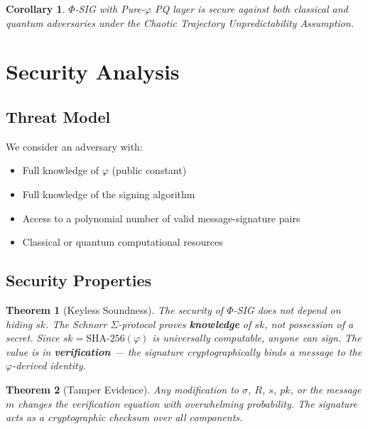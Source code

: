 \documentclass{article}
\newtheorem{theorem}{Theorem}[section]
\newtheorem{corollary}{Corollary}[theorem]
\begin{document}
\begin{corollary}
$\Phi$-SIG with Pure-$\varphi$ PQ layer is secure against both classical and quantum adversaries under the Chaotic Trajectory Unpredictability Assumption.
\end{corollary}

\section{Security Analysis}

\subsection{Threat Model}

We consider an adversary with:
\begin{itemize}
    \item Full knowledge of $\varphi$ (public constant)
    \item Full knowledge of the signing algorithm
    \item Access to a polynomial number of valid message-signature pairs
    \item Classical or quantum computational resources
\end{itemize}

\subsection{Security Properties}

\begin{theorem}[Keyless Soundness]
The security of $\Phi$-SIG does not depend on hiding $sk$. The Schnorr $\Sigma$-protocol proves \textbf{knowledge} of $sk$, not possession of a secret. Since $sk = \text{SHA-256}(\varphi)$ is universally computable, anyone \textit{can} sign. The value is in \textbf{verification} — the signature cryptographically binds a message to the $\varphi$-derived identity.
\end{theorem}

\begin{theorem}[Tamper Evidence]
Any modification to $\sigma$, $R$, $s$, $pk$, or the message $m$ changes the verification equation with overwhelming probability. The signature acts as a cryptographic checksum over all components.
\end{theorem}
\end{document}

